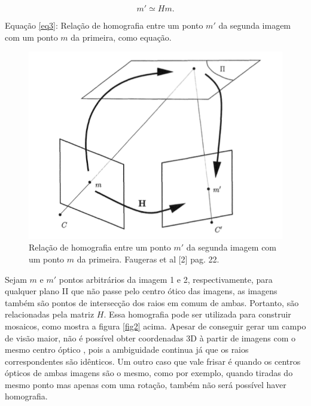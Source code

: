 \begin{equation}\label{eq3}
m' \simeq Hm.
\end{equation}

Equação \eqref{eq3}: Relação de homografia entre um ponto $m'$ da segunda imagem com um ponto $m$ da primeira, como equação.

\begin{figure}[H]
	\centering
		\includegraphics{Imagens/figura2-1.png}
	\caption{Relação de homografia entre um ponto $m'$ da segunda imagem com um ponto $m$ da primeira. Faugeras et al [2] pag. 22.}
	\label{fig1}
\end{figure}

 Sejam $m$ e $m'$ pontos arbitrários da imagem 1 e 2, respectivamente, para qualquer plano II que não passe pelo centro ótico das imagens, as imagens também são pontos de intersecção dos raios em comum de ambas. Portanto, são relacionadas pela matriz $H$. Essa homografia pode ser utilizada para construir mosaicos, como mostra a figura \ref{fig2} acima. Apesar de conseguir gerar um campo de visão maior, não é possível obter coordenadas 3D à partir de imagens com o mesmo centro óptico \cite{Faugeras-Geometry}, pois a ambiguidade continua já que os raios correspondentes são idênticos. Um outro caso que vale frisar é quando os centros ópticos de ambas imagens são o mesmo, como por exemplo, quando tiradas do mesmo ponto mas apenas com uma rotação, também não será possível haver homografia.

